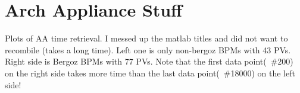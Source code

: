 \documentclass{article}
\begin{document}




\section{Arch Appliance Stuff}

\Large{Plots of AA time retrieval. I messed up the matlab titles and did not want to recombile (takes a long time). Left one is only non-bergoz BPMs with 43 PVs. Right side is Bergoz BPMs with 77 PVs. Note that the first data point(~\#200) on the right side takes more time than the last data point(~\#18000) on the left side!}
\end{document}
